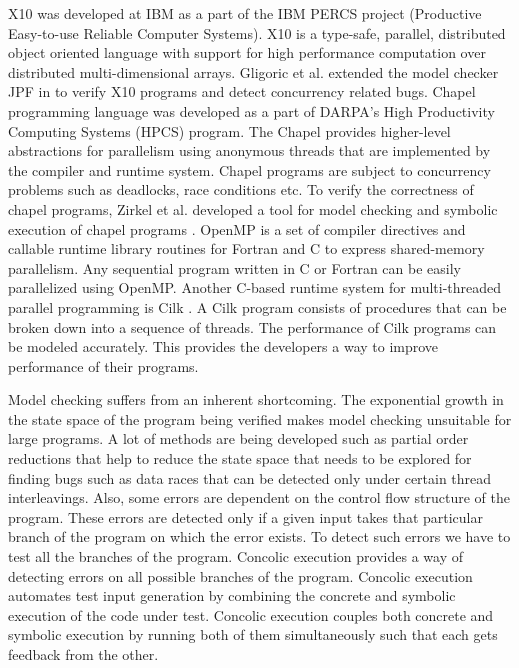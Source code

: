 X10 \cite{charles2005x10} was developed at IBM as a part of the IBM PERCS project (Productive Easy-to-use Reliable Computer Systems). X10 is a type-safe, parallel, distributed object oriented language with support for high performance computation over distributed multi-dimensional arrays. Gligoric et al. extended the model checker JPF in \cite{gligoric2012x10x} to verify X10 programs and detect concurrency related bugs. Chapel programming language \cite{chamberlain2007parallel} was developed as a part of DARPA's High Productivity Computing Systems (HPCS) program. The Chapel provides higher-level abstractions for parallelism using anonymous threads that are implemented by the compiler and runtime system. Chapel programs are subject to concurrency problems such as deadlocks, race conditions etc. To verify the correctness of chapel programs, Zirkel et al. developed a tool for model checking and symbolic execution of chapel programs \cite{zirkel2013automated}. OpenMP \cite{dagum1998openmp} is a set of compiler directives and callable runtime library routines for Fortran and C to express shared-memory parallelism. Any sequential program written in C or Fortran can be easily parallelized using OpenMP. Another C-based runtime system for multi-threaded parallel programming is Cilk \cite{blumofe1996cilk} . A Cilk program consists of procedures that can be broken down into a sequence of threads. The performance of Cilk programs can be modeled accurately. This provides the developers a way to improve performance of their programs.

Model checking suffers from an inherent shortcoming. The exponential growth in the state space of the program being verified makes model checking unsuitable for large programs. A lot of methods are being developed such as partial order reductions that help to reduce the state space that needs to be explored for finding bugs such as data races that can be detected only under certain thread interleavings. Also, some errors are dependent on the control flow structure of the program. These errors are detected only if a given input takes that particular branch of the program on which the error exists. To detect such errors we have to test all the branches of the program. Concolic execution provides a way of detecting errors on all possible branches of the program. Concolic execution automates test input generation by combining the concrete and symbolic execution of the code under test. Concolic execution couples both concrete and symbolic execution by running both of them simultaneously such that each gets feedback from the other.

